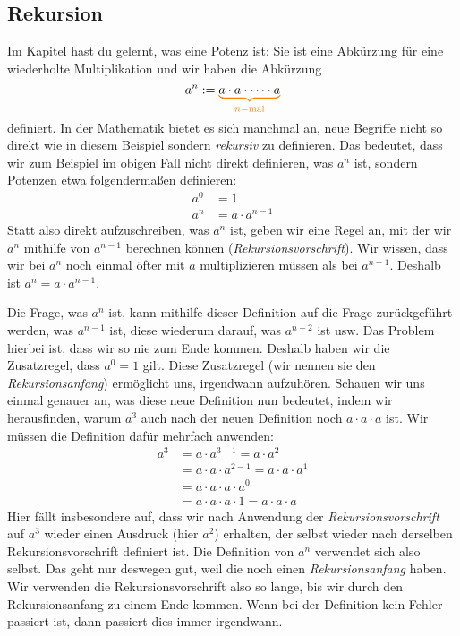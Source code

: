 \documentclass[../../main.tex]{subfiles}
\begin{document}
\subsection*{Rekursion}
Im Kapitel  hast du gelernt, was eine Potenz ist: Sie ist eine Abkürzung für eine wiederholte
Multiplikation und wir haben die Abkürzung
\[a^n:=\colorbrace{a\cdot a\cdot \dots \cdot a}{n-\text{mal}}\]
definiert. In der Mathematik bietet es sich manchmal an, neue Begriffe nicht so direkt wie in diesem Beispiel sondern
\emph{rekursiv} zu definieren. Das bedeutet, dass wir zum Beispiel im obigen Fall nicht direkt definieren, was $a^n$ ist,
sondern Potenzen etwa folgendermaßen definieren:
\begin{align}
    a^0&=1\\
    a^n&=a\cdot a^{n-1}
\end{align}
Statt also direkt aufzuschreiben, was $a^n$ ist, geben wir eine Regel an, mit der wir $a^n$ mithilfe von $a^{n-1}$
berechnen können (\emph{Rekursionsvorschrift}). Wir wissen, dass wir bei $a^n$ noch einmal öfter mit $a$ multiplizieren
müssen als bei $a^{n-1}$. Deshalb ist $a^n=a\cdot a^{n-1}$. 

Die Frage, was $a^n$ ist, kann mithilfe dieser Definition auf die Frage zurückgeführt werden, was $a^{n-1}$ ist, diese
wiederum darauf, was $a^{n-2}$ ist usw. Das Problem hierbei ist, dass wir so nie zum Ende kommen. Deshalb haben wir die
Zusatzregel, dass $a^0=1$ gilt. Diese Zusatzregel (wir nennen sie den \emph{Rekursionsanfang}) ermöglicht uns,
irgendwann aufzuhören. Schauen wir uns einmal genauer an, was diese neue Definition nun bedeutet, indem wir
herausfinden, warum $a^3$ auch nach der neuen Definition noch $a\cdot a\cdot a$ ist. Wir müssen die Definition dafür
mehrfach anwenden:
\begin{align*}
    a^3&=a\cdot a^{3-1}=a\cdot a^2\\
    &=a\cdot a\cdot a^{2-1}=a\cdot a\cdot a^1\\
    &=a\cdot a\cdot a\cdot a^0\\
    &=a\cdot a\cdot a\cdot 1=a\cdot a\cdot a
\end{align*}
Hier fällt insbesondere auf, dass wir nach Anwendung der \emph{Rekursionsvorschrift} auf $a^3$ wieder einen Ausdruck
(hier $a^2$) erhalten, der selbst wieder nach derselben Rekursionsvorschrift definiert ist. Die Definition von $a^n$
verwendet sich also selbst. Das geht nur deswegen gut, weil die noch einen \emph{Rekursionsanfang} haben. Wir verwenden
die Rekursionsvorschrift also so lange, bis wir durch den Rekursionsanfang zu einem Ende kommen. Wenn bei der Definition
kein Fehler passiert ist, dann passiert dies immer irgendwann.
\end{document}
